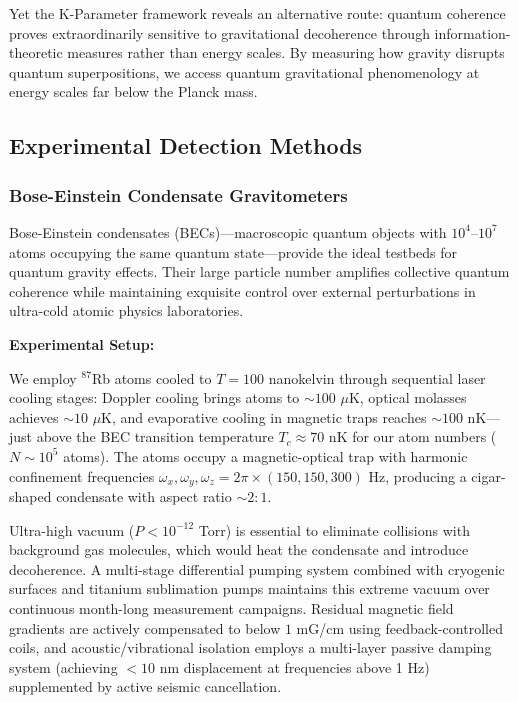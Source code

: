 \documentclass[11pt,a4paper,twoside]{article}
\begin{document}
Yet the K-Parameter framework reveals an alternative route: quantum coherence proves extraordinarily sensitive to gravitational decoherence through information-theoretic measures rather than energy scales. By measuring how gravity disrupts quantum superpositions, we access quantum gravitational phenomenology at energy scales far below the Planck mass.

\subsection{Experimental Detection Methods}

\subsubsection{Bose-Einstein Condensate Gravitometers}

Bose-Einstein condensates (BECs)---macroscopic quantum objects with $10^4$--$10^7$ atoms occupying the same quantum state---provide the ideal testbeds for quantum gravity effects. Their large particle number amplifies collective quantum coherence while maintaining exquisite control over external perturbations in ultra-cold atomic physics laboratories.

\textbf{Experimental Setup:}

We employ $^{87}$Rb atoms cooled to $T = 100$ nanokelvin through sequential laser cooling stages: Doppler cooling brings atoms to $\sim 100$ $\mu$K, optical molasses achieves $\sim 10$ $\mu$K, and evaporative cooling in magnetic traps reaches $\sim 100$ nK---just above the BEC transition temperature $T_c \approx 70$ nK for our atom numbers ($N \sim 10^5$ atoms). The atoms occupy a magnetic-optical trap with harmonic confinement frequencies $\omega_x, \omega_y, \omega_z = 2\pi \times (150, 150, 300)$ Hz, producing a cigar-shaped condensate with aspect ratio $\sim 2:1$.

Ultra-high vacuum ($P < 10^{-12}$ Torr) is essential to eliminate collisions with background gas molecules, which would heat the condensate and introduce decoherence. A multi-stage differential pumping system combined with cryogenic surfaces and titanium sublimation pumps maintains this extreme vacuum over continuous month-long measurement campaigns. Residual magnetic field gradients are actively compensated to below $1$ mG/cm using feedback-controlled coils, and acoustic/vibrational isolation employs a multi-layer passive damping system (achieving $<10$ nm displacement at frequencies above 1 Hz) supplemented by active seismic cancellation.
\end{document}
